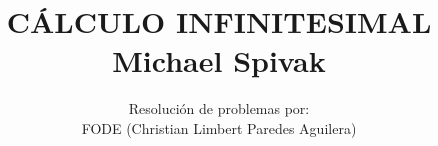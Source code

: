 \normalfont

\author{\Large Resolución de problemas por: \\ FODE \small (Christian Limbert Paredes Aguilera)}
\title{CÁLCULO INFINITESIMAL \\ \small Michael Spivak}
\date{}
\pagestyle{empty}
\maketitle
\thispagestyle{empty}
\let\cleardoublepage\clearpage
\tableofcontents 								%


 
\let\cleardoublepage\clearpage
